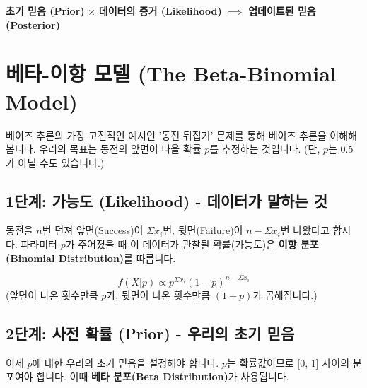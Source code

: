 \documentclass[11pt,a4paper]{book}
\theoremstyle{definition}
\begin{document}
\begin{summarybox}[title=베이즈 추론의 과정]
\textbf{초기 믿음 (Prior)} $\times$ \textbf{데이터의 증거 (Likelihood)} $\implies$ \textbf{업데이트된 믿음 (Posterior)}
\end{summarybox}

\section{베타-이항 모델 (The Beta-Binomial Model)}

베이즈 추론의 가장 고전적인 예시인 '동전 뒤집기' 문제를 통해 베이즈 추론을 이해해 봅니다.
우리의 목표는 동전의 앞면이 나올 확률 $p$를 추정하는 것입니다. (단, $p$는 0.5가 아닐 수도 있습니다.)

\subsection{1단계: 가능도 (Likelihood) - 데이터가 말하는 것}

동전을 $n$번 던져 앞면(Success)이 $\Sigma x_i$번, 뒷면(Failure)이 $n - \Sigma x_i$번 나왔다고 합시다.
파라미터 $p$가 주어졌을 때 이 데이터가 관찰될 확률(가능도)은 \textbf{이항 분포(Binomial Distribution)}를 따릅니다.

$$ f(X | p) \propto p^{\Sigma x_i} (1-p)^{n - \Sigma x_i} $$
(앞면이 나온 횟수만큼 $p$가, 뒷면이 나온 횟수만큼 $(1-p)$가 곱해집니다.)

\subsection{2단계: 사전 확률 (Prior) - 우리의 초기 믿음}

이제 $p$에 대한 우리의 초기 믿음을 설정해야 합니다. $p$는 확률값이므로 [0, 1] 사이의 분포여야 합니다.
이때 \textbf{베타 분포(Beta Distribution)}가 사용됩니다.
\end{document}
